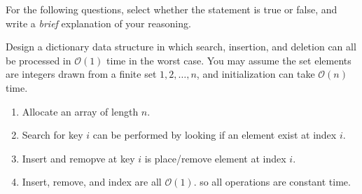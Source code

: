 \documentclass[12pt]{exam}
\begin{document}
\begin{questions}

\question For the following questions, select whether the statement is true or false,
and write a \textit{brief} explanation of your reasoning.


\clearpage

Design a dictionary data structure in which search, insertion,
and deletion can all be processed in $\mathcal{O}(1)$ time in the worst
case. You may assume the set elements are integers drawn from a finite set
$1, 2, \dots , n$, and initialization can take $\mathcal{O}(n)$ time.

\begin{enumerate}
  \item Allocate an array of length $n$.
  \item Search for key $i$ can be performed by looking if an element exist at index $i$.
  \item Insert and remopve at key $i$ is place/remove element at index $i$.
  \item Insert, remove, and index are all $\mathcal{O}(1)$. so all operations are constant time.
\end{enumerate}

\end{questions}
\end{document}
